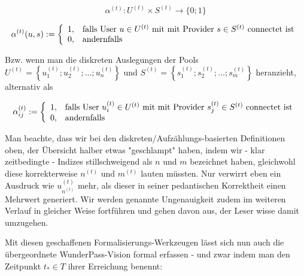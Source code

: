 \documentclass[11pt]{scrartcl}
\begin{document}
\begin{Def}\label{def:Def3}
\begin{equation*}
  \alpha^{(t)} : U^{(t)} \times S^{(t)} \rightarrow \{0; 1\} 
\end{equation*}

\[
\alpha^{(t)}(u, s):=\left\{%
\begin{array}{ll}
    1, & \hbox{falls User $u \in U^{(t)}$ mit mit Provider $s \in S^{(t)}$ connectet ist} \\
    0, & \hbox{andernfalls} \\
\end{array}%
\right.
\]

\vspace{1cm}

Bzw. wenn man die diskreten Auslegungen der Pools $U^{(t)} = \left\{ u^{(t)}_1; u^{(t)}_2;...; u^{(t)}_{n} \right\}$ und $S^{(t)} = \left\{ s^{(t)}_1; s^{(t)}_2;...; s^{(t)}_{m} \right\}$ heranzieht, alternativ als

\[
\alpha^{(t)}_{ij}:=\left\{%
\begin{array}{ll}
    1, & \hbox{falls User $u^{(t)}_i \in U^{(t)}$ mit mit Provider $s^{(t)}_j \in S^{(t)}$ connectet ist} \\
    0, & \hbox{andernfalls} \\
\end{array}%
\right.
\]

\end{Def}

\vspace{1cm}

Man beachte, dass wir bei den diskreten/Aufzählungs-basierten Definitionen oben, der Übersicht halber etwas "geschlampt" haben, indem wir - klar zeitbedingte - Indizes stillschweigend als $n$ und $m$ bezeichnet haben, gleichwohl diese korrekterweise $n^{(t)}$ und $m^{(t)}$ lauten müssten. Nur verwirrt eben ein Ausdruck wie $u^{(t)}_{n^{(t)}}$ mehr, als dieser in seiner pedantischen Korrektheit einen Mehrwert generiert. Wir werden genannte Ungenauigkeit zudem im weiteren Verlauf in gleicher Weise fortführen und gehen davon aus, der Leser wisse damit umzugehen. 

\vspace{0.3cm}

Mit diesen geschaffenen Formalisierungs-Werkzeugen lässt sich nun auch die übergeordnete WunderPass-Vision formal erfassen - und zwar indem man den Zeitpunkt $t_{*} \in T$ ihrer Erreichung benennt:
\end{document}
